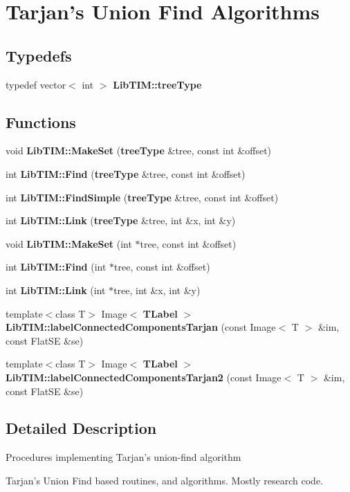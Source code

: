 \section{Tarjan's Union Find Algorithms}
\label{group__Tarjan}
\subsection*{Typedefs}
\begin{CompactItemize}
\item 
typedef vector$<$ int $>$ {\bf Lib\-TIM::tree\-Type}
\end{CompactItemize}
\subsection*{Functions}
\begin{CompactItemize}
\item 
void {\bf Lib\-TIM::Make\-Set} ({\bf tree\-Type} \&tree, const int \&offset)
\item 
int {\bf Lib\-TIM::Find} ({\bf tree\-Type} \&tree, const int \&offset)
\item 
int {\bf Lib\-TIM::Find\-Simple} ({\bf tree\-Type} \&tree, const int \&offset)
\item 
int {\bf Lib\-TIM::Link} ({\bf tree\-Type} \&tree, int \&x, int \&y)
\item 
void {\bf Lib\-TIM::Make\-Set} (int $\ast$tree, const int \&offset)
\item 
int {\bf Lib\-TIM::Find} (int $\ast$tree, const int \&offset)
\item 
int {\bf Lib\-TIM::Link} (int $\ast$tree, int \&x, int \&y)
\item 
template$<$class T$>$ Image$<$ {\bf TLabel} $>$ {\bf Lib\-TIM::label\-Connected\-Components\-Tarjan} (const Image$<$ T $>$ \&im, const Flat\-SE \&se)
\item 
template$<$class T$>$ Image$<$ {\bf TLabel} $>$ {\bf Lib\-TIM::label\-Connected\-Components\-Tarjan2} (const Image$<$ T $>$ \&im, const Flat\-SE \&se)
\end{CompactItemize}


\subsection{Detailed Description}
Procedures implementing Tarjan's union-find algorithm

Tarjan's Union Find based routines, and algorithms. Mostly research code.

